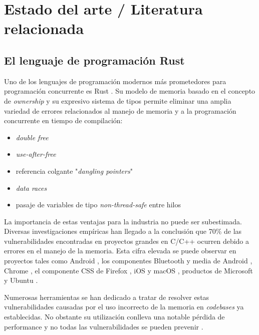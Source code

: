 \documentclass[12pt]{article}
\begin{document}
\bigskip

\section{Estado del arte / Literatura relacionada}

\subsection{El lenguaje de programación Rust}

Uno de los lenguajes de programación modernos más prometedores para programación concurrente es Rust \cite{rust-website}.
Su modelo de memoria basado en el concepto de \textit{ownership} y su expresivo sistema de tipos permite eliminar una amplia variedad de
errores relacionados al manejo de memoria y a la programación concurrente en tiempo de compilación:

\begin{itemize}
    \item \textit{double free} \cite[Cap. 4.1]{rust-book}
    \item \textit{use-after-free} \cite[Cap. 4.1]{rust-book}
    \item referencia colgante "\textit{dangling pointers}" \cite[Cap. 4.2]{rust-book}
    \item \textit{data races} \cite[Cap. 4.2]{rust-book}
    \item pasaje de variables de tipo \textit{non-thread-safe} entre hilos \cite[Cap. 16.4]{rust-book}
\end{itemize}

La importancia de estas ventajas para la industria no puede ser subestimada.
Diversas investigaciones empíricas han llegado a la conclusión que 70\% de las vulnerabilidades
encontradas en proyectos grandes en C/C++ ocurren debido a errores en el manejo de la memoria.
Esta cifra elevada se puede observar en proyectos tales como Android \cite{memory-bugs-android},
los componentes Bluetooth y media de Android \cite{memory-bugs-android-media-bluetooth},
Chrome \cite{memory-bugs-chrome}, el componente CSS de Firefox \cite{memory-bugs-firefox},
iOS y macOS \cite{memory-bugs-ios-macos}, productos de Microsoft \cite{miller-security-microsoft2019, memory-bugs-microsoft}
y Ubuntu \cite{memory-bugs-ubuntu}.

Numerosas herramientas se han dedicado a tratar de resolver estas vulnerabilidades causadas por el uso incorrecto de la memoria en \textit{codebases} ya establecidas.
No obstante su utilización conlleva una notable pérdida de performance y no todas las vulnerabilidades se pueden prevenir \cite{szekeres2013}.
\end{document}
